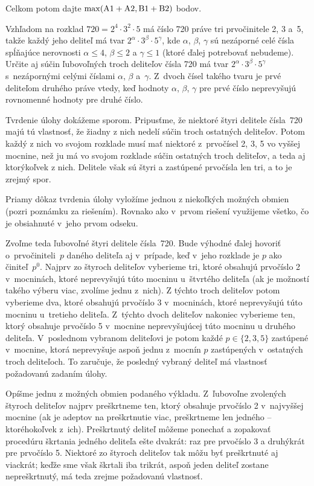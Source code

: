 {\noindent
Celkom potom dajte $\rm \max(A1+A2,B1+B2)$ bodov.
\endschema
}

{%
Vzhľadom na rozklad $720=2^4\cdot3^2\cdot5$ má číslo 720 práve tri
prvočinitele 2, 3 a~5, takže každý jeho deliteľ má tvar
$2^\alpha\cdot3^\beta\cdot5^\gamma$, kde $\alpha$, $\beta$, $\gamma$ sú
nezáporné celé čísla spĺňajúce nerovnosti $\alpha\leq4$, $\beta\leq2$ a
$\gamma\leq1$ (ktoré ďalej potrebovať nebudeme). Určite aj súčin
ľubovoľných troch deliteľov čísla 720 má tvar $2^\alpha\cdot3^\beta\cdot5^\gamma$
s~nezápornými celými číslami $\alpha$, $\beta$ a~$\gamma$. Z~dvoch čísel
takého tvaru je prvé deliteľom druhého práve vtedy, keď hodnoty
$\alpha$, $\beta$, $\gamma$ pre prvé číslo neprevyšujú rovnomenné
hodnoty pre druhé číslo.

Tvrdenie úlohy dokážeme sporom.
Pripusťme, že niektoré štyri delitele čísla~720
majú tú vlastnosť, že žiadny z nich nedelí súčin troch ostatných deliteľov.
Potom každý z nich vo svojom rozklade musí mať
niektoré z~prvočísel 2, 3, 5 vo vyššej mocnine, než ju má vo svojom rozklade
súčin ostatných troch deliteľov, a teda aj ktorýkoľvek z nich.
Delitele však sú štyri a zastúpené prvočísla len tri, a to je
zrejmý spor.

\ineriesenie
Priamy dôkaz tvrdenia úlohy vyložíme jednou z niekoľkých možných
obmien (pozri poznámku za riešením). Rovnako ako v~prvom riešení
využijeme všetko, čo je obsiahnuté v~jeho prvom odseku.

Zvoľme teda ľubovoľné štyri delitele čísla~720. Bude
výhodné ďalej hovoriť o~prvočiniteli~$p$ daného deliteľa
aj v~prípade, keď v~jeho rozklade je $p$  ako činiteľ~$p^0$.
Najprv zo štyroch deliteľov vyberieme tri,
ktoré obsahujú prvočíslo 2 v~mocninách, ktoré neprevyšujú
túto mocninu u~štvrtého deliteľa (ak je možností takého výberu viac,
zvolíme jednu z~nich). Z týchto troch
deliteľov potom vyberieme dva, ktoré obsahujú prvočíslo 3 v~mocninách,
ktoré neprevyšujú túto mocninu u~tretieho deliteľa. Z~týchto dvoch
deliteľov nakoniec vyberieme ten, ktorý obsahuje prvočíslo 5
v~mocnine neprevyšujúcej túto mocninu u druhého deliteľa.
V~poslednom vybranom deliteľovi je potom každé $p\in\{2,3,5\}$
zastúpené v~mocnine, ktorá neprevyšuje aspoň jednu z~mocnín $p$
zastúpených v~ostatných troch deliteľoch. To zaručuje, že
posledný vybraný deliteľ má vlastnosť požadovanú zadaním úlohy.

\poznamka
Opíšme jednu z možných obmien podaného výkladu.
Z~ľubovoľne zvolených štyroch deliteľov najprv preškrtneme ten,
ktorý obsahuje prvočíslo 2 v~najvyššej
mocnine (ak je adeptov na preškrtnutie viac, preškrtneme len
jedného -- ktoréhokoľvek z~ich).
Preškrtnutý deliteľ môžeme ponechať  a zopakovať procedúru
škrtania jedného deliteľa ešte dvakrát:
raz pre prvočíslo 3 a druhýkrát pre prvočíslo 5.
Niektoré zo štyroch deliteľov tak môžu byť preškrtnuté aj viackrát; keďže
sme však škrtali iba trikrát, aspoň jeden deliteľ
zostane nepreškrtnutý, má teda zrejme požadovanú vlastnosť.


}
